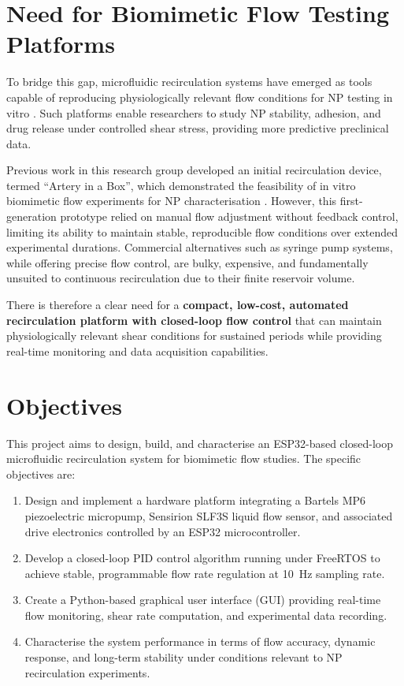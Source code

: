 \section{Need for Biomimetic Flow Testing Platforms}

To bridge this gap, microfluidic recirculation systems have emerged as tools capable of reproducing physiologically relevant flow conditions for NP testing in vitro \citep{Whitesides2006, Bhatia2014}. Such platforms enable researchers to study NP stability, adhesion, and drug release under controlled shear stress, providing more predictive preclinical data.

Previous work in this research group developed an initial recirculation device, termed ``Artery in a Box'', which demonstrated the feasibility of in vitro biomimetic flow experiments for NP characterisation \citep{Kacerik2024}. However, this first-generation prototype relied on manual flow adjustment without feedback control, limiting its ability to maintain stable, reproducible flow conditions over extended experimental durations. Commercial alternatives such as syringe pump systems, while offering precise flow control, are bulky, expensive, and fundamentally unsuited to continuous recirculation due to their finite reservoir volume.

There is therefore a clear need for a \textbf{compact, low-cost, automated recirculation platform with closed-loop flow control} that can maintain physiologically relevant shear conditions for sustained periods while providing real-time monitoring and data acquisition capabilities.

\section{Objectives}

This project aims to design, build, and characterise an ESP32-based closed-loop microfluidic recirculation system for biomimetic flow studies. The specific objectives are:

\begin{enumerate}
    \item Design and implement a hardware platform integrating a Bartels MP6 piezoelectric micropump, Sensirion SLF3S liquid flow sensor, and associated drive electronics controlled by an ESP32 microcontroller.
    \item Develop a closed-loop PID control algorithm running under FreeRTOS to achieve stable, programmable flow rate regulation at \SI{10}{\hertz} sampling rate.
    \item Create a Python-based graphical user interface (GUI) providing real-time flow monitoring, shear rate computation, and experimental data recording.
    \item Characterise the system performance in terms of flow accuracy, dynamic response, and long-term stability under conditions relevant to NP recirculation experiments.
\end{enumerate}

